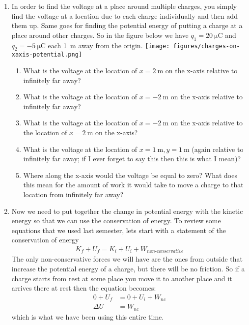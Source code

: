 \begin{enumerate}
\item
In order to find the voltage at a place around multiple charges, you simply find the voltage at a location due to each charge individually and then add them up. Same goes for finding the potential energy of putting a charge at a place around other charges. So in the figure below we have $q_1 = \SI{+20}{\micro\coulomb}$ and $q_2 = \SI{-5}{\micro\coulomb}$ each \SI{1}{\meter} away from the origin. \newline
\texttt{[image: figures/charges-on-xaxis-potential.png]}
\begin{enumerate}
\setlength\itemsep{1 in}
\item What is the voltage at the location of $x=\SI{+2}{\meter}$ on the x-axis relative to infinitely far away?
\item What is the voltage at the location of $x=\SI{-2}{\meter}$ on the x-axis relative to infinitely far away?
\item What is the voltage at the location of $x=\SI{-2}{\meter}$ on the x-axis relative to the location of $x=\SI{+2}{\meter}$ on the x-axis?
\item What is the voltage at the location of $x=\SI{+1}{\meter}, y=\SI{+1}{\meter}$ (again relative to infinitely far away; if I ever forget to say this then this is what I mean)?
\item Where along the x-axis would the voltage be equal to zero? What does this mean for the amount of work it would take to move a charge to that location from infinitely far away?
\end{enumerate}

\item
Now we need to put together the change in potential energy with the kinetic energy so that we can use the conservation of energy. To review some equations that we used last semester, lets start with a statement of the conservation of energy 
\begin{align*}
	 K_f + U_f = K_i + U_i + W_{\textit{non-conservative}}
\end{align*} 
The only non-conservative forces we will have are the ones from outside that increase the potential energy of a charge, but there will be no friction.  So if a charge starts from rest at some place you move it to another place and it arrives there at rest then the equation becomes:
\begin{align*}
	0 + U_f &= 0 + U_i +W_{\textit{nc}} \\
	\Delta U &= W_{\textit{nc}}
\end{align*}
which is what we have been using this entire time.


\end{enumerate}
